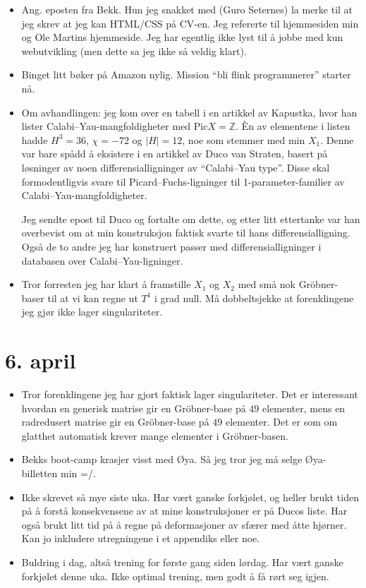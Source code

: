 \documentclass[11pt, norsk]{article}
\begin{document}
\begin{itemize}
  \item Ang. eposten fra Bekk. Hun jeg snakket med (Guro Seternes) la merke til at jeg skrev at jeg kan HTML/CSS på CV-en. Jeg refererte til hjemmesiden min og Ole Martins hjemmeside. Jeg har egentlig ikke lyst til å jobbe med kun webutvikling (men dette sa jeg ikke så veldig klart).
  \item Binget litt bøker på Amazon nylig. Mission ``bli flink programmerer'' starter nå.
  \item Om avhandlingen: jeg kom over en tabell i en artikkel av Kapustka, hvor han lister Calabi--Yau-mangfoldigheter med $\mathrm{Pic} X = \mathbb Z$. Èn av elementene i listen hadde $H^3=36$, $\chi=-72$ og $|H|=12$, noe som stemmer med min $X_1$. Denne var bare spådd å eksistere i en artikkel av Duco van Straten, basert på løsninger av noen differensialligninger av ``Calabi--Yau type''. Disse skal formodentligvis svare til Picard--Fuchs-ligninger til 1-parameter-familier av Calabi--Yau-mangfoldigheter.

  Jeg sendte epost til Duco og fortalte om dette, og etter litt ettertanke var han overbevist om at min konstruksjon faktisk svarte til hans differensialligning. Også de to andre jeg har konstruert passer med differensialligninger i databasen over Calabi--Yau-ligninger.
  \item Tror forresten jeg har klart å framstille $X_1$ og $X_2$ med små nok Gröbner-baser til at vi kan regne ut $T^1$ i grad null. Må dobbeltsjekke at forenklingene jeg gjør ikke lager singulariteter.
\end{itemize}


\section{6. april} %
\label{sec:6_april}

\begin{itemize}
  \item Tror forenklingene jeg har gjort faktisk lager singulariteter. Det er interessant hvordan en generisk matrise gir en Gröbner-base på $49$ elementer, mens en radredusert matrise gir en Gröbner-base på $49$ elementer. Det er som om glatthet automatisk krever mange elementer i Gröbner-basen.
  \item Bekks boot-camp krasjer visst med Øya. Så jeg tror jeg må selge Øya-billetten min =/.
  \item Ikke skrevet så mye siste uka. Har vært ganske forkjølet, og heller brukt tiden på å forstå konsekvensene av at mine konstruksjoner er på Ducos liste. Har også brukt litt tid på å regne på deformasjoner av sfærer med åtte hjørner. Kan jo inkludere utregningene i et appendiks eller noe.
  \item Buldring i dag, altså trening for første gang siden lørdag. Har vært ganske forkjølet denne uka. Ikke optimal trening, men godt å få rørt seg igjen.
\end{itemize}
\end{document}
